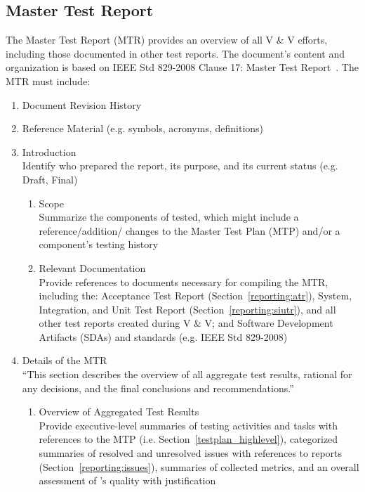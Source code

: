 \subsection{Master Test Report}\label{reporting:mtr}
The Master Test Report (MTR) provides an overview of all V \& V efforts,
including those documented in other test reports. The document's content and
organization is based on IEEE Std 829-2008 Clause 17: Master Test
Report~\citep{vvDocIEEE}. The MTR must include:
\begin{enumerate}

    \item Document Revision History

    \item Reference Material (e.g. symbols, acronyms, definitions)

    \item Introduction \\
    Identify who prepared the report, its purpose, and its current status (e.g.
    Draft, Final)
    \begin{enumerate}

        \item Scope \\
        Summarize the components of \progname{} tested, which might include a
        reference/addition/ changes to the Master Test Plan (MTP) and/or a
        component's testing history

        \item Relevant Documentation \\
        Provide references to documents necessary for compiling the MTR,
        including the: Acceptance Test Report (Section~\ref{reporting:atr}),
        System, Integration, and Unit Test Report
        (Section~\ref{reporting:siutr}), and all other test reports created
        during V \& V; and Software Development Artifacts (SDAs) and standards
        (e.g. IEEE Std 829-2008)

    \end{enumerate}

    \item Details of the MTR \\
    ``This section describes the overview of all aggregate test results,
    rational for any decisions, and the final conclusions and
    recommendations.''~\citep[p.~67]{vvDocIEEE}
    \begin{enumerate}

        \item Overview of Aggregated Test Results \\
        Provide executive-level summaries of testing activities and tasks with
        references to the MTP (i.e. Section~\ref{testplan_highlevel}),
        categorized summaries of resolved and unresolved issues with references
        to reports (Section~\ref{reporting:issues}), summaries of collected
        metrics, and an overall assessment of \progname{}'s quality with
        justification


\end{enumerate}
\end{enumerate}
